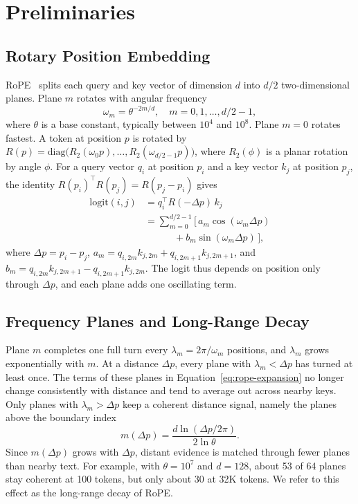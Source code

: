 \documentclass[11pt]{article}
\begin{document}
\section{Preliminaries}
\label{sec:preliminary}

\subsection{Rotary Position Embedding}

RoPE~\citep{su2024roformer} splits each query and key vector of dimension $d$ into $d/2$ two-dimensional planes. Plane $m$ rotates with angular frequency
\begin{equation}
\omega_m = \theta^{-2m/d}, \quad m = 0, 1, \ldots, d/2 - 1,
\label{eq:rope-freq}
\end{equation}
where $\theta$ is a base constant, typically between $10^4$ and $10^8$. Plane $m = 0$ rotates fastest. A token at position $p$ is rotated by $R(p) = \mathrm{diag}\big(R_2(\omega_0 p), \ldots, R_2(\omega_{d/2-1} p)\big)$, where $R_2(\phi)$ is a planar rotation by angle $\phi$. For a query vector $q_i$ at position $p_i$ and a key vector $k_j$ at position $p_j$, the identity $R(p_i)^\top R(p_j) = R(p_j - p_i)$ gives
\begin{equation}
\begin{aligned}
\mathrm{logit}(i, j) &= q_i^\top R(-\Delta p)\, k_j \\
&= \sum_{m=0}^{d/2-1} \big[\, a_m \cos(\omega_m \Delta p) \\
&\qquad\quad + b_m \sin(\omega_m \Delta p) \,\big],
\end{aligned}
\label{eq:rope-expansion}
\end{equation}
where $\Delta p = p_i - p_j$, $a_m = q_{i,2m} k_{j,2m} + q_{i,2m+1} k_{j,2m+1}$, and $b_m = q_{i,2m} k_{j,2m+1} - q_{i,2m+1} k_{j,2m}$. The logit thus depends on position only through $\Delta p$, and each plane adds one oscillating term.

\subsection{Frequency Planes and Long-Range Decay}

Plane $m$ completes one full turn every $\lambda_m = 2\pi/\omega_m$ positions, and $\lambda_m$ grows exponentially with $m$. At a distance $\Delta p$, every plane with $\lambda_m < \Delta p$ has turned at least once. The terms of these planes in Equation~\ref{eq:rope-expansion} no longer change consistently with distance and tend to average out across nearby keys. Only planes with $\lambda_m > \Delta p$ keep a coherent distance signal, namely the planes above the boundary index
\begin{equation}
m(\Delta p) = \frac{d \ln(\Delta p / 2\pi)}{2 \ln \theta}.
\label{eq:wrap-index}
\end{equation}
Since $m(\Delta p)$ grows with $\Delta p$, distant evidence is matched through fewer planes than nearby text. For example, with $\theta = 10^7$ and $d = 128$, about 53 of 64 planes stay coherent at 100 tokens, but only about 30 at 32K tokens. We refer to this effect as the long-range decay of RoPE.
\end{document}
